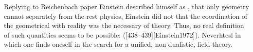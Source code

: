 \documentclass[draft]{article}
\begin{document}












Replying to Reichenbach paper Einstein described himself as , that only  geometry cannot separately from the rest physics, Einstein did not that the coordination of the geometrical with reality was the necessary of theory. Thus, no real definition of such quantities seems to be possible:  ([438--439][Einstein1972]).  Neverhtesl  in which one finds oneself in the search for a unified, non-dualistic, field theory. 
\end{document}
